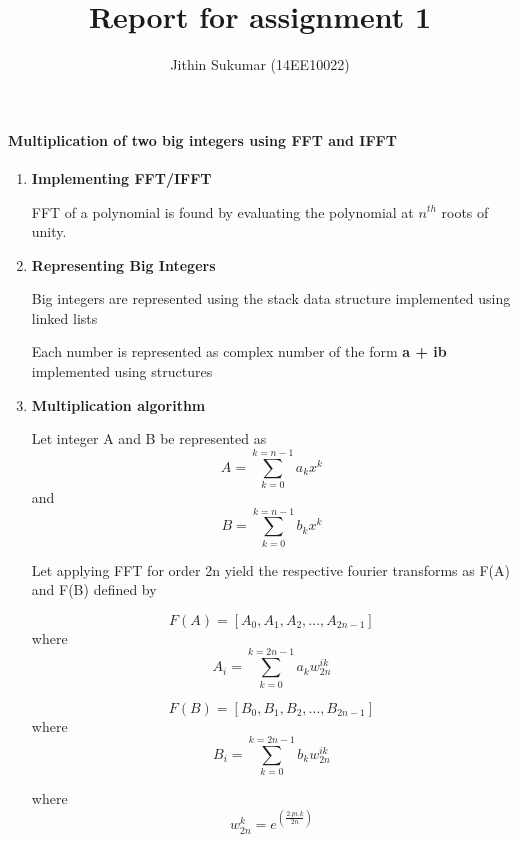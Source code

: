 \documentclass[a4paper,11pt]{article}
\title{Report for assignment 1}
\author{Jithin Sukumar (14EE10022)}
\begin{document}
\maketitle

\paragraph{Multiplication of two big integers using FFT and IFFT}
\begin{enumerate}
 \item \textbf{Implementing FFT/IFFT}

FFT of a polynomial is found by evaluating the polynomial at $n^{th}$ roots of unity.

\item \textbf{Representing Big Integers}

Big integers are represented using the stack data structure implemented using linked lists

Each number is represented as complex number of the form \textbf{a + ib} implemented using structures

\item \textbf{Multiplication algorithm}

Let integer A and B be represented as
\begin{equation}
A = \sum_{k=0}^{k=n-1} a_{k}x^k
\end{equation}
and 
\begin{equation}
B = \sum_{k=0}^{k=n-1} b_{k}x^k
\end{equation}

Let applying FFT for order 2n yield the respective fourier transforms as F(A) and F(B) defined by

\begin{equation}
F(A) = [A_{0}, A_{1}, A_{2}, ..., A_{2n-1}]\end{equation} where \begin{equation}
A_i = \sum_{k=0}^{k=2n-1} a_{k}w_{2n}^{ik}\end{equation}

\begin{equation}
F(B) = [B_{0}, B_{1}, B_{2}, ..., B_{2n-1}]\end{equation} where \begin{equation}
B_i = \sum_{k=0}^{k=2n-1} b_{k}w_{2n}^{ik}\end{equation}

where \begin{equation}
w_{2n}^k = e^(\frac{2.pi.k}{2n}) \end{equation}


\end{enumerate}
\end{document}
